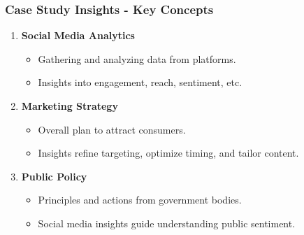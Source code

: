 \documentclass{beamer}
\begin{document}
\begin{frame}[fragile]
    \frametitle{Case Study Insights - Key Concepts}
    \begin{enumerate}
        \item \textbf{Social Media Analytics} 
        \begin{itemize}
            \item Gathering and analyzing data from platforms.
            \item Insights into engagement, reach, sentiment, etc.
        \end{itemize}
        
        \item \textbf{Marketing Strategy}
        \begin{itemize}
            \item Overall plan to attract consumers.
            \item Insights refine targeting, optimize timing, and tailor content.
        \end{itemize}
        
        \item \textbf{Public Policy}
        \begin{itemize}
            \item Principles and actions from government bodies.
            \item Social media insights guide understanding public sentiment. 
        \end{itemize}
    \end{enumerate}
\end{frame}
\end{document}
